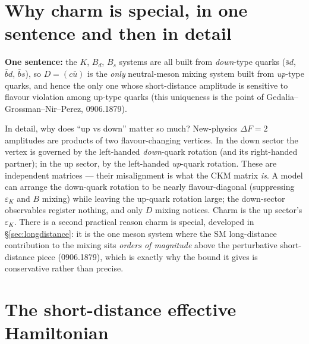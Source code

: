\documentclass[11pt]{article}
\newcommand{\eps}{\varepsilon}
\theoremstyle{definition}
\begin{document}
\section{Why charm is special, in one sentence and then in detail}
\label{sec:special}

\textbf{One sentence:} the $K$, $B_d$, $B_s$ systems are all built from
\emph{down}-type quarks ($\bar s d$, $\bar b d$, $\bar b s$), so $D = (c\bar u)$
is the \emph{only} neutral-meson mixing system built from \emph{up}-type quarks,
and hence the only one whose short-distance amplitude is sensitive to flavour
violation among up-type quarks (this uniqueness is the point of
Gedalia--Grossman--Nir--Perez, 0906.1879).

In detail, why does ``up vs down'' matter so much? New-physics
$\Delta F=2$ amplitudes are products of two flavour-changing vertices. In the
down sector the vertex is governed by the left-handed \emph{down}-quark rotation
(and its right-handed partner); in the up sector, by the left-handed
\emph{up}-quark rotation. These are independent matrices --- their misalignment
is what the CKM matrix \emph{is}. A model can arrange the down-quark rotation to
be nearly flavour-diagonal (suppressing $\eps_K$ and $B$ mixing) while leaving
the up-quark rotation large; the down-sector observables register nothing, and
only $D$ mixing notices. Charm is the up sector's $\eps_K$. There is a second
practical reason charm is special, developed in \S\ref{sec:longdistance}: it is
the one meson system where the SM long-distance contribution to the mixing sits
\emph{orders of magnitude} above the perturbative short-distance piece
(0906.1879), which is exactly why the bound it gives is conservative rather than
precise.

\section{The short-distance effective Hamiltonian}
\label{sec:operators}
\end{document}
